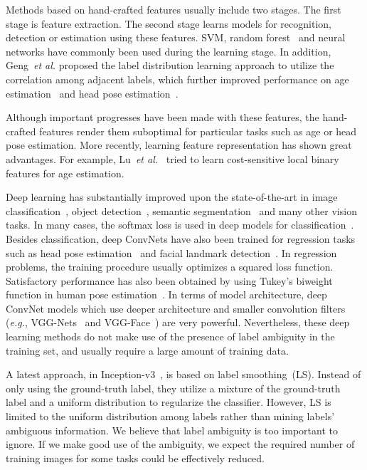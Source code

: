 \documentclass[journal]{IEEEtran}
\begin{document}
Methods based on hand-crafted features usually include two stages. The first stage is feature extraction. The second stage learns models for recognition, detection or estimation using these features. SVM, random forest~\cite{fanelli2011real} and neural networks have commonly been used during the learning stage. In addition, Geng~\emph{et al.} proposed the label distribution learning approach to utilize the correlation among adjacent labels, which further improved performance on age estimation~\cite{geng2013facial} and head pose estimation~\cite{geng2014head}.

Although important progresses have been made with these features, the hand-crafted features render them suboptimal for particular tasks such as age or head pose estimation. More recently, learning feature representation has shown great advantages. For example, Lu~\emph{et al.}~\cite{lu2015cost} tried to learn cost-sensitive local binary features for age estimation.

Deep learning has substantially improved upon the state-of-the-art in image classification~\cite{he2015deep}, object detection~\cite{girshick2014rich}, semantic segmentation~\cite{long2015fully} and many other vision tasks. In many cases, the softmax loss is used in deep models for classification~\cite{he2015deep}. Besides classification, deep ConvNets have also been trained for regression tasks such as head pose estimation~\cite{ahn2015real} and facial landmark detection~\cite{sun2013deep}. In regression problems, the training procedure usually optimizes a squared  loss function. Satisfactory performance has also been obtained by using Tukey's biweight function in human pose estimation~\cite{belagiannis2015robust}. In terms of model architecture, deep ConvNet models which use deeper architecture and smaller convolution filters (\emph{e.g.}, VGG-Nets~\cite{simonyan2015very} and VGG-Face~\cite{Parkhi15}) are very powerful. Nevertheless, these deep learning methods do not make use of the presence of label ambiguity in the training set, and usually require a large amount of training data.

A latest approach, in Inception-v3~\cite{szegedy2015rethinking}, is based on label smoothing~(LS). Instead of only using the ground-truth label, they utilize a mixture of the ground-truth label and a uniform distribution to regularize the classifier. However, LS is limited to the uniform distribution among labels rather than mining labels' ambiguous information. We believe that label ambiguity is too important to ignore. If we make good use of the ambiguity, we expect the required number of training images for some tasks could be effectively reduced.
\end{document}
